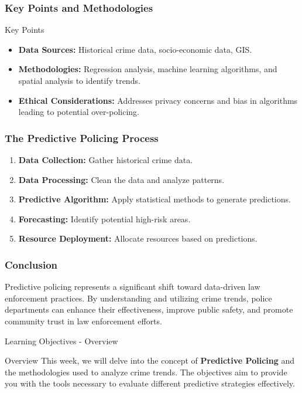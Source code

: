 \documentclass[aspectratio=169]{beamer}
\begin{document}
\begin{frame}[fragile]
    \frametitle{Key Points and Methodologies}
    \begin{block}{Key Points}
        \begin{itemize}
            \item \textbf{Data Sources:} Historical crime data, socio-economic data, GIS.
            \item \textbf{Methodologies:} Regression analysis, machine learning algorithms, and spatial analysis to identify trends.
            \item \textbf{Ethical Considerations:} Addresses privacy concerns and bias in algorithms leading to potential over-policing.
        \end{itemize}
    \end{block}
\end{frame}

\begin{frame}[fragile]
    \frametitle{The Predictive Policing Process}
    \begin{enumerate}
        \item \textbf{Data Collection:} Gather historical crime data.
        \item \textbf{Data Processing:} Clean the data and analyze patterns.
        \item \textbf{Predictive Algorithm:} Apply statistical methods to generate predictions.
        \item \textbf{Forecasting:} Identify potential high-risk areas.
        \item \textbf{Resource Deployment:} Allocate resources based on predictions.
    \end{enumerate}
\end{frame}

\begin{frame}[fragile]
    \frametitle{Conclusion}
    Predictive policing represents a significant shift toward data-driven law enforcement practices. 
    By understanding and utilizing crime trends, police departments can enhance their effectiveness, improve public safety, and promote community trust in law enforcement efforts.
\end{frame}

\begin{frame}[fragile]{Learning Objectives - Overview}
    \begin{block}{Overview}
        This week, we will delve into the concept of \textbf{Predictive Policing} and the methodologies used to analyze crime trends. The objectives aim to provide you with the tools necessary to evaluate different predictive strategies effectively.
    \end{block}
\end{frame}
\end{document}
